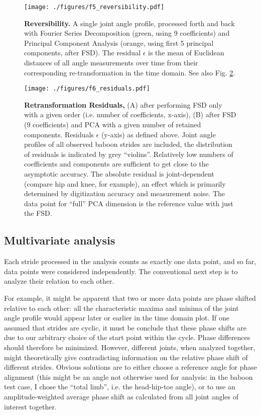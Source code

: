 \begin{figure}[p]
\centering
\texttt{[image: ./figures/f5\_reversibility.pdf]}
\caption{\label{fig:reversibility}\textbf{Reversibility.} A single joint angle profile, processed forth and back with Fourier Series Decomposition (green, using 9 coefficients) and Principal Component Analysis (orange, using first 5 principal components, after FSD). The residual \(\epsilon\) is the mean of Euclidean distances of all angle measurements over time from their corresponding re-transformation in the time domain. See also Fig. \ref{fig:residuals}.}
\end{figure}

\begin{figure}[p]
\centering
\texttt{[image: ./figures/f6\_residuals.pdf]}
\caption{\label{fig:residuals}\textbf{Retransformation Residuals,} (A) after performing FSD only with a given order (i.e. number of coefficients, x-axis), (B) after FSD (9 coefficients) and PCA with a given number of retained components. Residuals \(\epsilon\) (y-axis) as defined above. Joint angle profiles of all observed baboon strides are included, the distribution of residuals is indicated by grey ``violins''. Relatively low numbers of coefficients and components are sufficient to get close to the asymptotic accuracy. The absolute residual is joint-dependent (compare hip and knee, for example), an effect which is primarily determined by digitization accuracy and measurement noise. The data point for ``full'' PCA dimension is the reference value with just the FSD.}
\end{figure}

\subsection{Multivariate analysis}
\label{sec:org2440b46}
Each stride processed in the analysis counts as exactly one data point, and so far, data points were considered independently.
The conventional next step is to analyze their relation to each other.

For example, it might be apparent that two or more data points are phase shifted relative to each other: all the characteristic maxima and minima of the joint angle profile would appear later or earlier in the time domain plot.
If one assumed that strides are cyclic, it must be conclude that these phase shifts are due to our arbitrary choice of the start point within the cycle.
Phase differences should therefore be minimized.
However, different joints, when analyzed together, might theoretically give contradicting information on the relative phase shift of different strides.
Obvious solutions are to either choose a reference angle for phase alignment (this might be an angle not otherwise used for analysis: in the baboon test case, I chose the ``total limb'', i.e. the head-hip-toe angle), or to use an amplitude-weighted average phase shift as calculated from all joint angles of interest together.


